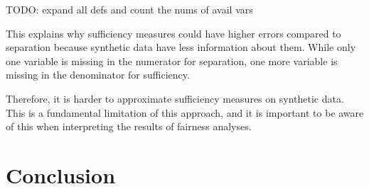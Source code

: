\documentclass[manuscript,screen,review,anonymous]{acmart}
\begin{document}
TODO: expand all defs and count the nums of avail vars

This explains why sufficiency measures could have higher errors compared to separation because synthetic data have less information about them. While only one variable is missing in the numerator for separation, one more variable is missing in the denominator for sufficiency.

Therefore, it is harder to approximate sufficiency measures on synthetic data. This is a fundamental limitation of this approach, and it is important to be aware of this when interpreting the results of fairness analyses.




\section{Conclusion}







\end{document}
